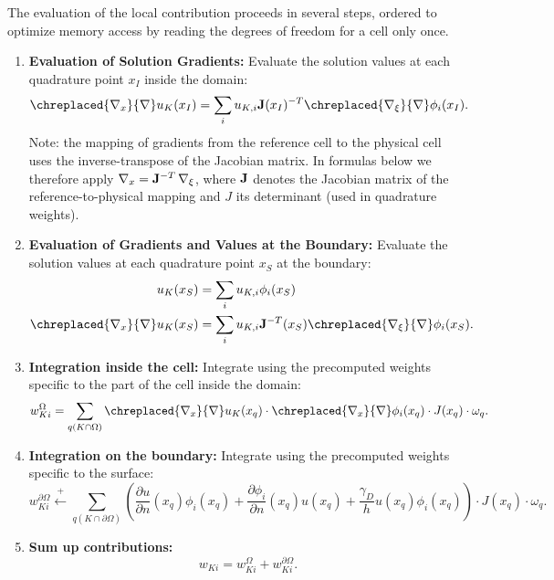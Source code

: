 \documentclass[11pt,a4paper]{article}
\begin{document}
The evaluation of the local contribution proceeds in several steps, ordered to optimize memory access by reading the
degrees of freedom for a cell only once.
\begin{enumerate}
    \item \textbf{Evaluation of Solution Gradients:} Evaluate the solution values at each quadrature point $x_I$
          inside the
          domain:
          \begin{align}
              \chreplaced{\nabla_x}{\nabla} u_K(x_I) & = \sum_i u_{K,i} \bfm{J}(x_I)^{-T}	\chreplaced{\nabla_\xi}{\nabla} \phi_i(x_I).
          \end{align}
          Note: the mapping of gradients from the reference cell to the physical cell uses the
          inverse-transpose
          of the Jacobian matrix. In formulas below we therefore apply
          $\nabla_x = {\rm\bf J}^{-T}\,\nabla_{\xi}$, where ${\rm\bf J}$ denotes the Jacobian matrix of the
          reference-to-physical mapping and $J$ its determinant (used in quadrature weights).
    \item \textbf{Evaluation of Gradients and Values at the Boundary:} Evaluate the solution values at each
          quadrature point $ x_S$ at the boundary:
          \begin{align}
              u_K(x_S)                               & = \sum_i u_{K,i}  \phi_i(x_S)                                                   \\
              \chreplaced{\nabla_x}{\nabla} u_K(x_S) & = \sum_i u_{K,i} \bfm{J}^{-T}(x_S)	\chreplaced{\nabla_\xi}{\nabla} \phi_i(x_S).
          \end{align}
    \item \textbf{Integration inside the cell:} Integrate using the precomputed weights specific to the part of the
          cell inside the domain:
          \begin{equation}
              w^{\Omega}_{Ki} = \sum_{q(K \cap \Omega)} \chreplaced{\nabla_x}{\nabla} u_K(x_q) \cdot \chreplaced{\nabla_x}{\nabla}\phi_i(x_q) \cdot J(x_q) \cdot
              \omega_q.
          \end{equation}

    \item \textbf{Integration on the boundary:} Integrate using the precomputed weights specific to the surface:
          \begin{equation}
              w^{\partial\Omega}_{Ki} \stackrel{+}{\leftarrow} \sum_{q(K \cap \partial\Omega)} \left( \frac{\partial
                  u}{\partial
                  n}(x_q)
              \phi_i(x_q) + \frac{\partial \phi_i}{\partial n}(x_q) u(x_q) + \frac{\gamma_D}{h} u(x_q)
              \phi_i(x_q) \right)
              \cdot
              J(x_q)
              \cdot
              \omega_q.
          \end{equation}
    \item  \textbf{Sum up contributions:}
          \begin{equation}
              w_{Ki}= w^{\Omega}_{Ki} + w^{\partial\Omega}_{Ki}.
          \end{equation}

\end{enumerate}
\end{document}
